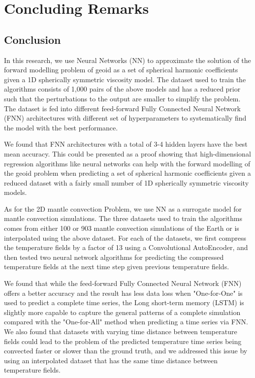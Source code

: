 \chapter{Concluding Remarks}\label{chap:conclusion}

\section{Conclusion}

In this research, we use Neural Networks (NN) to approximate the solution of the forward modelling problem of geoid as a set of spherical harmonic coefficients given a 1D spherically symmetric viscosity model. The dataset used to train the algorithms consists of 1,000 pairs of the above models and has a reduced prior such that the perturbations to the output are smaller to simplify the problem. The dataset is fed into different feed-forward Fully Connected Neural Network (FNN) architectures with different set of hyperparameters  to systematically find the model with the best performance. 

We found that FNN architectures with a total of 3-4 hidden layers have the best mean accuracy. This could be presented as a proof showing that high-dimensional regression algorithms like neural networks can help with the forward modelling of the geoid problem when predicting a set of spherical harmonic coefficients given a reduced dataset with a fairly small number of 1D spherically symmetric viscosity models.

As for the 2D mantle convection Problem, we use NN as a surrogate model for mantle convection simulations. The three datasets used to train the algorithms comes from either 100 or 903 mantle convection simulations of the Earth or is interpolated using the above dataset. For each of the datasets, we first compress the temperature fields by a factor of 13 using a Convolutional AutoEncoder, and then tested two neural network algorithms for predicting the compressed temperature fields at the next time step given previous temperature fields. 

We found that while the feed-forward Fully Connected Neural Network (FNN) offers a better accuracy and the result has less data loss when "One-for-One" is used to predict a complete time series, the Long short-term memory (LSTM) is slightly more capable to capture the general patterns of a complete simulation compared with the "One-for-All" method when predicting a time series via FNN. We also found that datasets with varying time distance between temperature fields could lead to the problem of the predicted temperature time series being convected faster or slower than the ground truth, and we addressed this issue by using an interpolated dataset that has the same time distance between temperature fields.

